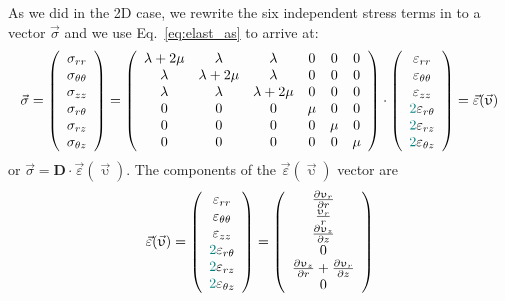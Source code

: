 As we did in the 2D case, we rewrite the six independent stress terms in to a vector $\vec\sigma$ and we use Eq.~\eqref{eq:elast_as} to arrive at:
\[
\vec{\sigma}=
\left(
\begin{array}{c}
\sigma_{rr} \\
\sigma_{\theta\theta} \\
\sigma_{zz} \\
\sigma_{r\theta} \\
\sigma_{rz} \\
\sigma_{\theta z} 
\end{array}
\right)
=
\left(
\begin{array}{cccccc}
\lambda+2\mu & \lambda & \lambda & 0 & 0 & 0 \\
\lambda & \lambda+2\mu & \lambda & 0 & 0 & 0 \\
\lambda & \lambda & \lambda+2\mu & 0 & 0 & 0 \\
0 & 0 & 0 & \mu & 0 & 0\\
0 & 0 & 0 & 0 & \mu & 0\\
0 & 0 & 0 & 0 & 0 & \mu
\end{array}
\right)
\cdot
\left(
\begin{array}{c}
\varepsilon_{rr} \\
\varepsilon_{\theta\theta} \\
\varepsilon_{zz} \\
{\color{teal}2}\varepsilon_{r\theta} \\
{\color{teal}2}\varepsilon_{rz} \\
{\color{teal}2}\varepsilon_{\theta z} 
\end{array}
\right)
=\vec\varepsilon(\vec \upupsilon)
\]
or $\vec\sigma = {\bm D} \cdot \vec\varepsilon(\vec \upupsilon)$. 
The components of the $\vec\varepsilon(\vec\upupsilon)$ vector are
\[
\vec\varepsilon(\vec \upupsilon)
=
\left(
\begin{array}{c}
\varepsilon_{rr} \\
\varepsilon_{\theta\theta} \\
\varepsilon_{zz} \\
{\color{teal}2}\varepsilon_{r\theta} \\
{\color{teal}2}\varepsilon_{rz} \\
{\color{teal}2}\varepsilon_{\theta z} 
\end{array}
\right)
=
\left(
\begin{array}{c}
\frac{\partial \upupsilon_r}{\partial r} \\ 
\frac{\upupsilon_r}{r} \\ 
\frac{\partial \upupsilon_z}{\partial z} \\ 
0 \\ 
\frac{\partial \upupsilon_z}{\partial r}+
\frac{\partial \upupsilon_r}{\partial z} \\ 
0
\end{array}
\right)
\]
